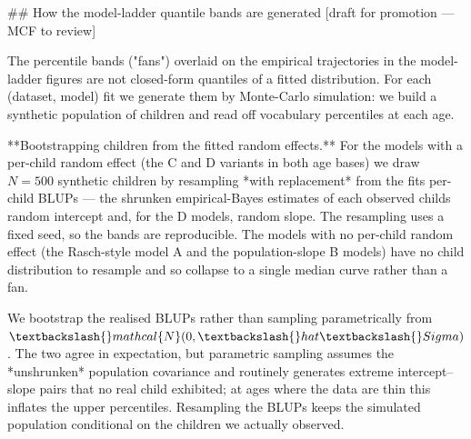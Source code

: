 \documentclass[
  11pt,
]{article}
\newenvironment{Shaded}{\begin{snugshade}}{\end{snugshade}}
\newcommand{\FunctionTok}[1]{\textcolor[rgb]{0.28,0.35,0.67}{#1}}
\newcommand{\NormalTok}[1]{\textcolor[rgb]{0.00,0.23,0.31}{#1}}
\begin{document}
\begin{Shaded}
\begin{Highlighting}[]
\FunctionTok{\#\# How the model{-}ladder quantile bands are generated  [draft for promotion — MCF to review]}

\NormalTok{The percentile bands ("fans") overlaid on the empirical trajectories in the}
\NormalTok{model{-}ladder figures are not closed{-}form quantiles of a fitted distribution. For}
\NormalTok{each (dataset, model) fit we generate them by Monte{-}Carlo simulation: we build a}
\NormalTok{synthetic population of children and read off vocabulary percentiles at each age.}

\NormalTok{**Bootstrapping children from the fitted random effects.** For the models with a}
\NormalTok{per{-}child random effect (the C and D variants in both age bases) we draw}
\NormalTok{$N = 500$ synthetic children by resampling *with replacement* from the fit\textquotesingle{}s}
\NormalTok{per{-}child BLUPs — the shrunken empirical{-}Bayes estimates of each observed child\textquotesingle{}s}
\NormalTok{random intercept and, for the D models, random slope. The resampling uses a fixed}
\NormalTok{seed, so the bands are reproducible. The models with no per{-}child random effect}
\NormalTok{(the Rasch{-}style model A and the population{-}slope B models) have no child}
\NormalTok{distribution to resample and so collapse to a single median curve rather than a}
\NormalTok{fan.}

\NormalTok{We bootstrap the realised BLUPs rather than sampling parametrically from}
\NormalTok{$\textbackslash{}mathcal\{N\}(0, \textbackslash{}hat\textbackslash{}Sigma)$. The two agree in expectation, but parametric}
\NormalTok{sampling assumes the *unshrunken* population covariance and routinely generates}
\NormalTok{extreme intercept–slope pairs that no real child exhibited; at ages where the}
\NormalTok{data are thin this inflates the upper percentiles. Resampling the BLUPs keeps the}
\NormalTok{simulated population conditional on the children we actually observed.}


\end{Highlighting}
\end{Shaded}
\end{document}
